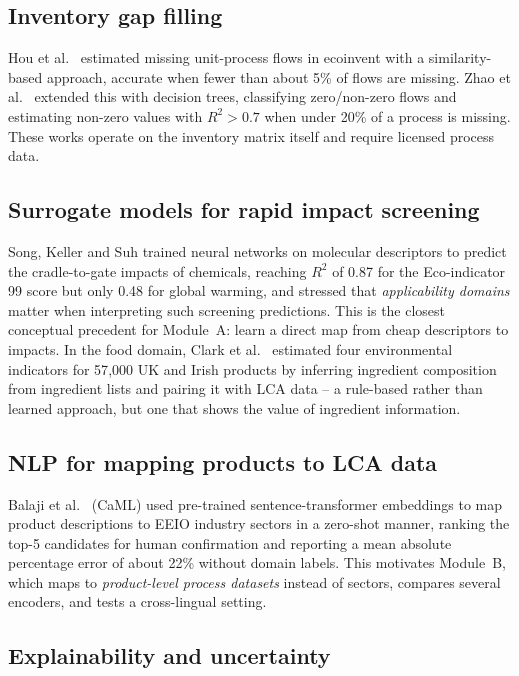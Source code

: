 \subsection{Inventory gap filling}

Hou et al.\ \citep{hou2018} estimated missing unit-process flows in ecoinvent with a
similarity-based approach, accurate when fewer than about 5\% of flows are missing. Zhao et al.\
\citep{zhao2021} extended this with decision trees, classifying zero/non-zero flows and estimating
non-zero values with $R^2>0.7$ when under 20\% of a process is missing. These works operate on the
inventory matrix itself and require licensed process data.

\subsection{Surrogate models for rapid impact screening}

Song, Keller and Suh \citep{song2017} trained neural networks on molecular descriptors to predict
the cradle-to-gate impacts of chemicals, reaching $R^2$ of 0.87 for the Eco-indicator 99 score but
only 0.48 for global warming, and stressed that \emph{applicability domains} matter when
interpreting such screening predictions. This is the closest conceptual precedent for Module~A:
learn a direct map from cheap descriptors to impacts. In the food domain, Clark et al.\
\citep{clark2022} estimated four environmental indicators for 57{,}000 UK and Irish products by
inferring ingredient composition from ingredient lists and pairing it with LCA data -- a
rule-based rather than learned approach, but one that shows the value of ingredient information.

\subsection{NLP for mapping products to LCA data}

Balaji et al.\ \citep{balaji2023caml} (CaML) used pre-trained sentence-transformer embeddings
\citep{reimers2019} to map product descriptions to EEIO industry sectors in a zero-shot manner,
ranking the top-5 candidates for human confirmation and reporting a mean absolute percentage error
of about 22\% without domain labels. This motivates Module~B, which maps to \emph{product-level
process datasets} instead of sectors, compares several encoders, and tests a cross-lingual setting.

\subsection{Explainability and uncertainty}

